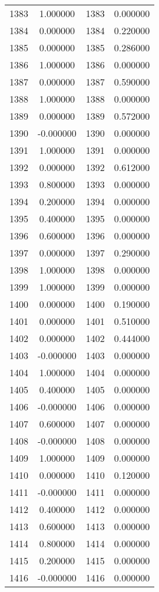 \documentclass[12pt]{article}
\begin{document}
\begin{longtable}{@{}cccc@{}}
1383 & 1.000000 & 1383 & 0.000000 \\
1384 & 0.000000 & 1384 & 0.220000 \\
1385 & 0.000000 & 1385 & 0.286000 \\
1386 & 1.000000 & 1386 & 0.000000 \\
1387 & 0.000000 & 1387 & 0.590000 \\
1388 & 1.000000 & 1388 & 0.000000 \\
1389 & 0.000000 & 1389 & 0.572000 \\
1390 & -0.000000 & 1390 & 0.000000 \\
1391 & 1.000000 & 1391 & 0.000000 \\
1392 & 0.000000 & 1392 & 0.612000 \\
1393 & 0.800000 & 1393 & 0.000000 \\
1394 & 0.200000 & 1394 & 0.000000 \\
1395 & 0.400000 & 1395 & 0.000000 \\
1396 & 0.600000 & 1396 & 0.000000 \\
1397 & 0.000000 & 1397 & 0.290000 \\
1398 & 1.000000 & 1398 & 0.000000 \\
1399 & 1.000000 & 1399 & 0.000000 \\
1400 & 0.000000 & 1400 & 0.190000 \\
1401 & 0.000000 & 1401 & 0.510000 \\
1402 & 0.000000 & 1402 & 0.444000 \\
1403 & -0.000000 & 1403 & 0.000000 \\
1404 & 1.000000 & 1404 & 0.000000 \\
1405 & 0.400000 & 1405 & 0.000000 \\
1406 & -0.000000 & 1406 & 0.000000 \\
1407 & 0.600000 & 1407 & 0.000000 \\
1408 & -0.000000 & 1408 & 0.000000 \\
1409 & 1.000000 & 1409 & 0.000000 \\
1410 & 0.000000 & 1410 & 0.120000 \\
1411 & -0.000000 & 1411 & 0.000000 \\
1412 & 0.400000 & 1412 & 0.000000 \\
1413 & 0.600000 & 1413 & 0.000000 \\
1414 & 0.800000 & 1414 & 0.000000 \\
1415 & 0.200000 & 1415 & 0.000000 \\
1416 & -0.000000 & 1416 & 0.000000 \\

\end{longtable}
\end{document}
